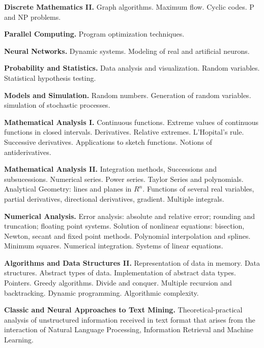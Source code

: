 \documentclass[]{resume-openfont}
\begin{document}
    \textbf{Discrete Mathematics II.} Graph algorithms. Maximum flow. Cyclic
    codes. P and NP problems.

    \textbf{Parallel Computing.} Program optimization techniques.
    
    \textbf{Neural Networks.} Dynamic systems. Modeling of real and artificial
    neurons.

    \textbf{Probability and Statistics.} Data analysis and visualization. Random
    variables. Statistical hypothesis testing.

    \textbf{Models and Simulation.} Random numbers. Generation of random
    variables. simulation of stochastic processes.

    \textbf{Mathematical Analysis I.} Continuous functions. Extreme values of
    continuous functions in closed intervals. Derivatives. Relative extremes.
    L'Hopital's rule. Successive derivatives. Applications to sketch functions.
    Notions of antiderivatives.

    \textbf{Mathematical Analysis II.} Integration methods, Successions and
    subsucessions. Numerical series. Power series. Taylor Series and
    polynomials. Analytical Geometry: lines and planes in $ R ^ n $. Functions
    of several real variables, partial derivatives, directional derivatives,
    gradient. Multiple integrals.

    \textbf{Numerical Analysis.} Error analysis: absolute and relative error;
    rounding and truncation; floating point systems. Solution of nonlinear
    equations: bisection, Newton, secant and fixed point methods. Polynomial
    interpolation and splines. Minimum squares. Numerical integration. Systems
    of linear equations.

    \textbf{Algorithms and Data Structures II.} Representation of data in
    memory. Data structures. Abstract types of data. Implementation of abstract
    data types. Pointers. Greedy algorithms. Divide and conquer. Multiple
    recursion and backtracking. Dynamic programming. Algorithmic complexity.


    \textbf{Classic and Neural Approaches to Text Mining.}
    Theoretical-practical analysis of unstructured information received in text
    format that arises from the interaction of Natural Language Processing,
    Information Retrieval and Machine Learning.
\end{document}
